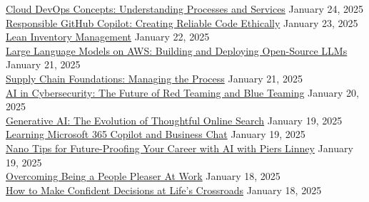 \documentclass[10pt]{res} %
\begin{document}
\begin{resume}
\href{https://www.linkedin.com/learning/certificates/8f190e9cfeda7dcfaee6c70574d260f002a7279a6dfa071c5c883c69f6af3eda}{\color{blue}Cloud DevOps Concepts: Understanding Processes and Services} \hfill January 24, 2025 \\
\href{https://www.linkedin.com/learning/certificates/eceed5ff4d5a4081bf9cb2a962484d4e46406b3bd312a573f200a21a40e0ad28}{\color{blue}Responsible GitHub Copilot: Creating Reliable Code Ethically} \hfill January 23, 2025 \\
\href{https://www.linkedin.com/learning/certificates/f0482e260f81db36c6aa91f568da0efde696ca16bbe0f88e531da9d7862a1ba0}{\color{blue}Lean Inventory Management} \hfill January 22, 2025 \\
\href{https://www.linkedin.com/learning/certificates/aad08f9f036b770794b7ea9d0e59d9d0fef07b328cae6d550e71ad64d194f192}{\color{blue}Large Language Models on AWS: Building and Deploying Open-Source LLMs} \hfill January 21, 2025 \\
\href{https://www.linkedin.com/learning/certificates/7a3464f703cbe6540be728ceb28408762a3848ea0f2d948634a11ae13719d777}{\color{blue}Supply Chain Foundations: Managing the Process} \hfill January 21, 2025 \\
\href{https://www.linkedin.com/learning/certificates/7abe0d30c64b1e74bc7e3695e20347db7accb4c14cfd6a9ed5bde6a9b531c79a}{\color{blue}AI in Cybersecurity: The Future of Red Teaming and Blue Teaming} \hfill January 20, 2025 \\
\href{https://www.linkedin.com/learning/certificates/99fd55fe233a135abdc5985e4727fa55b66228ae2fb3c4cc81b81bffb68771d4}{\color{blue}Generative AI: The Evolution of Thoughtful Online Search} \hfill January 19, 2025 \\
\href{https://www.linkedin.com/learning/certificates/a55a95c77b6afb8d39028fe7378125402da5b1feef30fb44fa8da1e655800055}{\color{blue}Learning Microsoft 365 Copilot and Business Chat} \hfill January 19, 2025 \\
\href{https://www.linkedin.com/learning/certificates/afab56114f2ff0b6262bcb5078fc35ce879d67fb4414e98207e42aae98768274}{\color{blue}Nano Tips for Future-Proofing Your Career with AI with Piers Linney} \hfill January 19, 2025 \\
\href{https://www.linkedin.com/learning/certificates/4036be36001a7d167d35e0801f3cd9e79f34a6fa5a612b7bf0564952bbf0353d}{\color{blue}Overcoming Being a People Pleaser At Work} \hfill January 18, 2025 \\
\href{https://www.linkedin.com/learning/certificates/0e361dfdacc1d6e698122763776e2ec29580449876902d2083a6a2b70b90a07e}{\color{blue}How to Make Confident Decisions at Life's Crossroads} \hfill January 18, 2025 \\

\end{resume}
\end{document}
